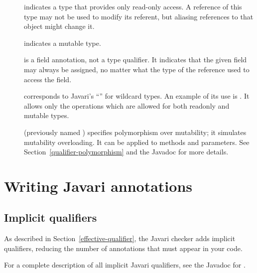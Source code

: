 \begin{description}

\item[]
  indicates a type that provides only read-only access.  A reference of
  this type may not be used to modify its referent, but aliasing references
  to that object might change it.

\item[]
  indicates a mutable type.
  
\item[]
  is a field annotation, not a type qualifier.  It indicates that the given
  field may always be assigned, no matter what the type of the reference
  used to access the field.
  
\item[]
  corresponds to Javari's ``'' for wildcard types.  An
  example of its use is .  It allows only the
  operations which are allowed for both readonly and mutable types.

\item[]
  (previously named ) specifies polymorphism over
  mutability; it simulates mutability overloading.  It can be applied to
  methods and parameters.  See Section~\ref{qualifier-polymorphism} and the
   Javadoc for more details.

\end{description}


\section{Writing Javari annotations\label{writing-javari-annotations}}


\subsection{Implicit qualifiers\label{javari-implicit-qualifiers}}

As described in Section~\ref{effective-qualifier}, the Javari checker
adds implicit qualifiers, reducing the number of annotations that must
appear in your code.

For a complete description of all implicit Javari qualifiers, see the
Javadoc for .


